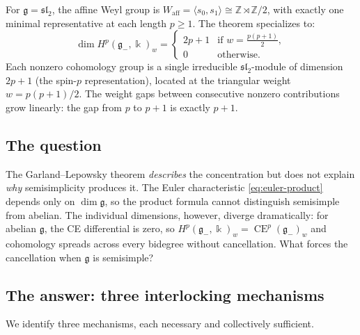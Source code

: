 \documentclass[11pt,reqno]{amsart}
\theoremstyle{plain}
\theoremstyle{definition}
\theoremstyle{remark}
\DeclareMathOperator{\CE}{CE}
\newcommand{\fg}{\mathfrak{g}}
\newcommand{\Waff}{W_{\mathrm{aff}}}
\newcommand{\gminus}{\fg_{-}}
\newcommand{\ZZ}{\mathbb{Z}}
\newcommand{\kk}{\Bbbk}
\begin{document}
For $\fg = \mathfrak{sl}_2$, the affine Weyl group is $\Waff = \langle s_0,
s_1 \rangle \cong \ZZ \rtimes \ZZ/2$, with exactly one minimal representative
at each length $p \ge 1$. The theorem specializes to:
\begin{equation}\label{eq:GL-sl2}
 \dim H^p(\gminus, \kk)_w =
 \begin{cases}
 2p + 1 & \text{if } w = \tfrac{p(p+1)}{2}, \\
 0 & \text{otherwise}.
 \end{cases}
\end{equation}
Each nonzero cohomology group is a single irreducible $\mathfrak{sl}_2$-module
of dimension $2p+1$ (the spin-$p$ representation), located at the triangular
weight $w = p(p+1)/2$. The weight gaps between consecutive nonzero
contributions grow linearly: the gap from $p$ to $p+1$ is exactly $p+1$.

\subsection{The question}

The Garland--Lepowsky theorem \emph{describes} the concentration but does not
explain \emph{why} semisimplicity produces it. The Euler characteristic
\eqref{eq:euler-product} depends only on $\dim \fg$, so the product formula
cannot distinguish semisimple from abelian. The individual dimensions,
however, diverge dramatically: for abelian $\fg$, the CE differential is
zero, so $H^p(\gminus,\kk)_w = \CE^p(\gminus)_w$ and cohomology spreads
across every bidegree without cancellation. What forces the cancellation when
$\fg$ is semisimple?

\subsection{The answer: three interlocking mechanisms}

We identify three mechanisms, each necessary and collectively sufficient.
\end{document}
